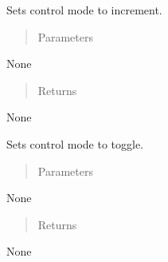 \documentclass[letterpaper,10pt,english]{sphinxmanual}
\begin{document}
\begin{fulllineitems}

\begin{fulllineitems}
\label{\detokenize{generic:AnalogOutputObject.AnalogOutputObject.set_control_increment}}
\sphinxAtStartPar
Sets control mode to increment.
\begin{quote}\begin{description}
\item[{Parameters}] \leavevmode
\end{description}\end{quote}

\sphinxAtStartPar
None
\begin{quote}\begin{description}
\item[{Returns}] \leavevmode
\end{description}\end{quote}

\sphinxAtStartPar
None

\end{fulllineitems}


\begin{fulllineitems}
\label{\detokenize{generic:AnalogOutputObject.AnalogOutputObject.set_control_toggle}}
\sphinxAtStartPar
Sets control mode to toggle.
\begin{quote}\begin{description}
\item[{Parameters}] \leavevmode
\end{description}\end{quote}

\sphinxAtStartPar
None
\begin{quote}\begin{description}
\item[{Returns}] \leavevmode
\end{description}\end{quote}

\sphinxAtStartPar
None


\end{fulllineitems}
\end{fulllineitems}
\end{document}
